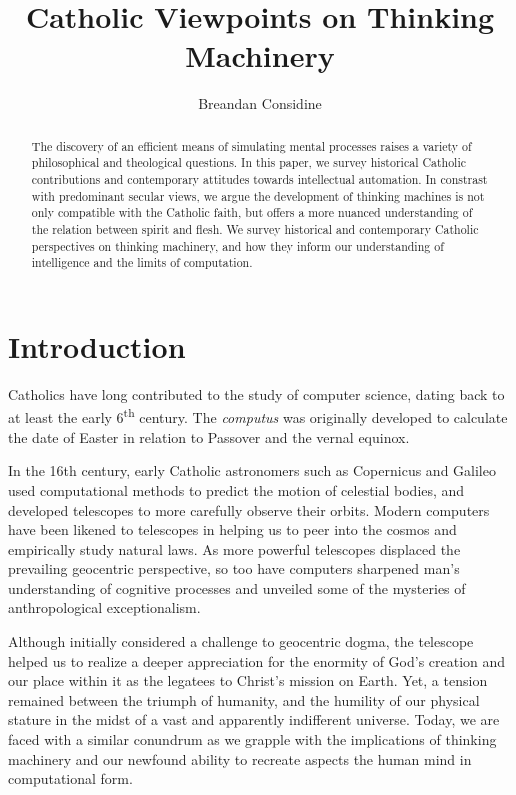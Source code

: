 \documentclass[sigplan,nonacm]{acmart}\settopmatter{printfolios=false,printccs=false,printacmref=false}
\begin{document}
  \title{Catholic Viewpoints on Thinking Machinery}
  \begin{abstract}
  The discovery of an efficient means of simulating mental processes raises a variety of philosophical and theological questions. In this paper, we survey historical Catholic contributions and contemporary attitudes towards intellectual automation. In constrast with predominant secular views, we argue the development of thinking machines is not only compatible with the Catholic faith, but offers a more nuanced understanding of the relation between spirit and flesh. We survey historical and contemporary Catholic perspectives on thinking machinery, and how they inform our understanding of intelligence and the limits of computation.
  \end{abstract}

  \author{Breandan Considine}

  \maketitle

  \section{Introduction}

  Catholics have long contributed to the study of computer science, dating back to at least the early 6\textsuperscript{th} century. The \textit{computus} was originally developed to calculate the date of Easter in relation to Passover and the vernal equinox.

  In the 16th century, early Catholic astronomers such as Copernicus and Galileo used computational methods to predict the motion of celestial bodies, and developed telescopes to more carefully observe their orbits. Modern computers have been likened to telescopes in helping us to peer into the cosmos and empirically study natural laws. As more powerful telescopes displaced the prevailing geocentric perspective, so too have computers sharpened man's understanding of cognitive processes and unveiled some of the mysteries of anthropological exceptionalism.

  Although initially considered a challenge to geocentric dogma, the telescope helped us to realize a deeper appreciation for the enormity of God's creation and our place within it as the legatees to Christ's mission on Earth. Yet, a tension remained between the triumph of humanity, and the humility of our physical stature in the midst of a vast and apparently indifferent universe. Today, we are faced with a similar conundrum as we grapple with the implications of thinking machinery and our newfound ability to recreate aspects the human mind in computational form.
\end{document}
